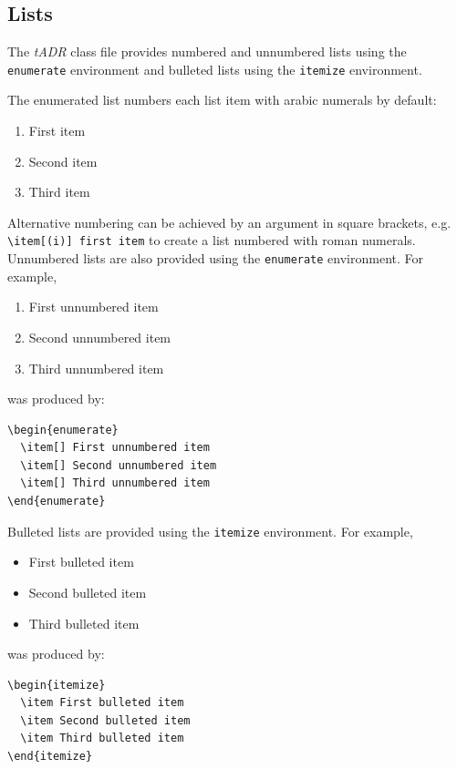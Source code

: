 \documentclass{tADR2e}
\begin{document}
\subsection{Lists}

The {\it tADR} class file provides numbered and unnumbered lists using the {\tt enumerate} environment and bulleted
lists  using the {\tt itemize} environment.

The enumerated list numbers each list item with arabic numerals by default:
%
\begin{enumerate}
   \item First item
   \item Second item
   \item Third item
\end{enumerate}
%
Alternative numbering can be achieved by an argument in square brackets, e.g. \verb"\item[(i)] first item" to create a list numbered with roman numerals.
%
Unnumbered lists are also provided using the {\tt enumerate} environment.
For example,
\begin{enumerate}
   \item[] First unnumbered item
   \item[] Second unnumbered item
   \item[] Third unnumbered item
\end{enumerate}
was produced by:
%
\begin{verbatim}
\begin{enumerate}
  \item[] First unnumbered item
  \item[] Second unnumbered item
  \item[] Third unnumbered item
\end{enumerate}
\end{verbatim}
%
Bulleted lists are provided using the {\tt itemize} environment. For example,
\begin{itemize}
\item First bulleted item
\item Second bulleted item
\item Third bulleted item
\end{itemize}
was produced by:
%
\begin{verbatim}
\begin{itemize}
  \item First bulleted item
  \item Second bulleted item
  \item Third bulleted item
\end{itemize}
\end{verbatim}
\end{document}
